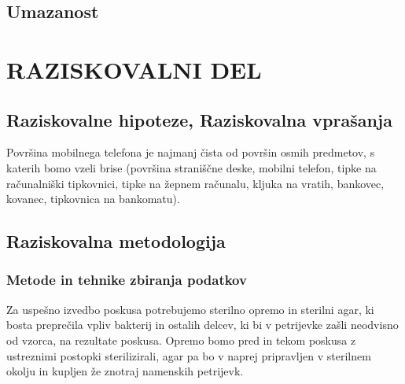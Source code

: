 \documentclass[12pt, a4paper, oneside]{report}
\begin{document}
\section{Umazanost}

\chapter{RAZISKOVALNI DEL}

\section{Raziskovalne hipoteze, Raziskovalna vprašanja}

Površina mobilnega telefona je najmanj čista od površin osmih predmetov, s katerih bomo vzeli brise (površina straniščne deske, mobilni telefon, tipke na računalniški tipkovnici, tipke na žepnem računalu, kljuka na vratih, bankovec, kovanec, tipkovnica na bankomatu).

\section{Raziskovalna metodologija}

\subsection{Metode in tehnike zbiranja podatkov}

Za uspešno izvedbo poskusa potrebujemo sterilno opremo in sterilni agar, ki bosta preprečila vpliv bakterij in ostalih delcev, ki bi v petrijevke zašli neodvisno od vzorca, na rezultate poskusa. Opremo bomo pred in tekom poskusa z ustreznimi postopki sterilizirali, agar pa bo v naprej pripravljen v sterilnem okolju in kupljen že znotraj namenskih petrijevk.
\end{document}
